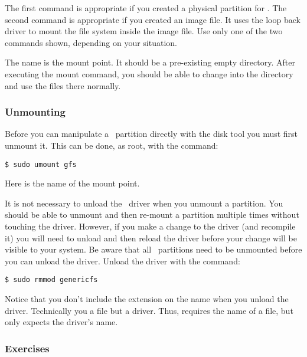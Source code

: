 The first command is appropriate if you created a physical partition for \GenericFS. The second
command is appropriate if you created an image file. It uses the loop back driver to mount the
file system inside the image file. Use only one of the two commands shown, depending on your
situation.

The name  is the mount point. It should be a pre-existing empty directory. After
executing the mount command, you should be able to change into the  directory and
use the files there normally.

\subsubsection{Unmounting}

Before you can manipulate a \GenericFS\ partition directly with the disk tool you must first
unmount it. This can be done, as root, with the command:
\begin{verbatim}
$ sudo umount gfs
\end{verbatim}

Here  is the name of the mount point.

It is not necessary to unload the \GenericFS\ driver when you unmount a partition. You should be
able to unmount and then re-mount a partition multiple times without touching the driver.
However, if you make a change to the driver (and recompile it) you will need to unload and then
reload the driver before your change will be visible to your system. Be aware that all
\GenericFS\ partitions need to be unmounted before you can unload the driver. Unload the driver
with the command:
\begin{verbatim}
$ sudo rmmod genericfs
\end{verbatim}

Notice that you don't include the  extension on the name when you unload the
driver. Technically you  a file but  a driver. Thus,
 requires the name of a file, but  only expects the driver's
name.

\subsubsection*{Exercises}

